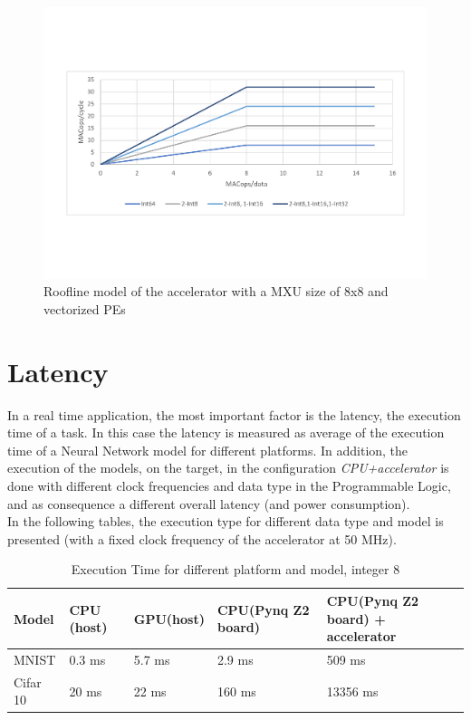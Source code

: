 \begin{figure}[!htbp]
\centering
\captionsetup{justification=centering}
\includegraphics[scale=0.45,angle=0]{./figure/graphs/roofline_vectorized.pdf}
\caption{Roofline model of the accelerator with a MXU size of 8x8 and vectorized PEs}
\label{fig:rooflinevect}
\end{figure}
 \newpage
 
\section{Latency}
In a real time application, the most important factor is the latency, the execution time of a task.
In this case the latency is measured as average of the execution time of a Neural Network model for different platforms. In addition, the execution of the models, on the target, in the configuration \textit{CPU+accelerator} is done with different clock frequencies and data type in the Programmable Logic, and as consequence a different overall latency (and power consumption).\\
In the following tables, the execution type for different data type and model is presented (with a fixed clock frequency of the accelerator at 50 MHz).
\begin{center}
\begin{table}[!htbp]
\centering
\captionsetup{justification=centering}
\begin{tabular}{ |p{2.5cm}||p{2.5cm}|p{2.5cm}|p{2.5cm}|p{2.5cm}| }
\hline
Model & CPU (host)\protect\footnotemark[1] & GPU(host)\protect\footnotemark[2] & CPU(Pynq Z2 board)\protect\footnotemark[3] & CPU(Pynq Z2 board) + accelerator \\
\hline
MNIST & 0.3 ms & 5.7 ms & 2.9 ms  &  509 ms 
\\
\hline
Cifar 10& 20 ms & 22 ms& 160 ms & 13356 ms\\
\hline
\end{tabular}
\caption{Execution Time for different platform and model, integer 8}
\label{table:moplatint8}
\end{table}
\end{center}

